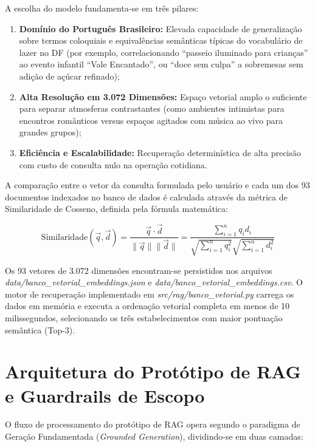 \documentclass[12pt,a4paper]{article}
\begin{document}
A escolha do modelo fundamenta-se em três pilares:
\begin{enumerate}[label=\alph*)]
\item \textbf{Domínio do Português Brasileiro:} Elevada capacidade de generalização sobre termos coloquiais e equivalências semânticas típicas do vocabulário de lazer no DF (por exemplo, correlacionando ``passeio iluminado para crianças'' ao evento infantil ``Vale Encantado'', ou ``doce sem culpa'' a sobremesas sem adição de açúcar refinado);
\item \textbf{Alta Resolução em 3.072 Dimensões:} Espaço vetorial amplo o suficiente para separar atmosferas contrastantes (como ambientes intimistas para encontros românticos versus espaços agitados com música ao vivo para grandes grupos);
\item \textbf{Eficiência e Escalabilidade:} Recuperação determinística de alta precisão com custo de consulta nulo na operação cotidiana.
\end{enumerate}

A comparação entre o vetor da consulta formulada pelo usuário e cada um dos 93 documentos indexados no banco de dados é calculada através da métrica de Similaridade de Cosseno, definida pela fórmula matemática:

\begin{equation}
\text{Similaridade}(\vec{q}, \vec{d}) = \frac{\vec{q} \cdot \vec{d}}{\|\vec{q}\| \|\vec{d}\|} = \frac{\sum_{i=1}^{n} q_i d_i}{\sqrt{\sum_{i=1}^{n} q_i^2} \sqrt{\sum_{i=1}^{n} d_i^2}}
\end{equation}

Os 93 vetores de 3.072 dimensões encontram-se persistidos nos arquivos \textit{data/banco\_vetorial\_embeddings.json} e \textit{data/banco\_vetorial\_embeddings.csv}. O motor de recuperação implementado em \textit{src/rag/banco\_vetorial.py} carrega os dados em memória e executa a ordenação vetorial completa em menos de 10 milissegundos, selecionando os três estabelecimentos com maior pontuação semântica (Top-3).

\section{Arquitetura do Protótipo de RAG e Guardrails de Escopo}

O fluxo de processamento do protótipo de RAG opera segundo o paradigma de Geração Fundamentada (\textit{Grounded Generation}), dividindo-se em duas camadas:
\end{document}
